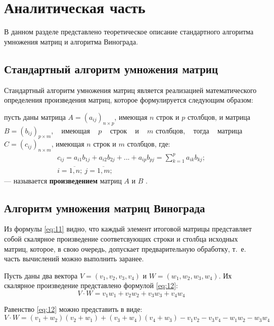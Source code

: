 \chapter{Аналитическая часть}

В данном разделе представлено теоретическое описание стандартного алгоритма
умножения матриц и алгоритма Винограда.

\section{Стандартный алгоритм умножения матриц}

Стандартный алгоритм умножения матриц является реализацией математического
определения произведения матриц, которое формулируется следующим образом:

    пусть даны матрица $A = (a_{ij})_{n \times p}$, имеющая $n$ строк и $p$
столбцов, и матрица ~$B = (b_{ij})_{p \times m}$, ~ имеющая ~ $p$ ~ строк ~ и ~
$m$ столбцов, ~ тогда ~ матрица\\ ${C=(c_{ij})_{n \times m}}$, имеющая $n$
строк и $m$ столбцов, где:
\begin{equation}\label{eq:11}
    \begin{gathered}
        c_{ij}=a_{i1}b_{1j}+a_{i2}b_{2j} +...+a_{ip}b_{pj}=\sum\limits_{k=1}^p
        a_{ik}b_{kj};\\
        i = \overline{1,n};~j = \overline{1,m};
    \end{gathered}
\end{equation}
--- называется \textbf{произведением} матриц $A$ и $B$ \cite{math}.

\section{Алгоритм умножения матриц Винограда}

Из формулы \ref{eq:11} видно, что каждый элемент итоговой матрицы представляет
собой скалярное произведение соответсвующих строки и столбца исходных матриц,
которое, в свою очередь, допускает предварительную обработку, т.~е. часть
вычислений можно выполнить заранее.

Пусть даны два вектора $V=(v_1, v_2, v_3, v_4)$ и
$W=(w_1,w_2,w_3,w_4)$. Их скалярное произведение
представлено формулой \ref{eq:12}:
\begin{equation}\label{eq:12}
    V \cdot W = v_1w_1+v_2w_2+v_3w_3+v_4w_4
\end{equation}

Равенство \ref{eq:12} можно представить в виде:
\begin{equation}\label{eq:13}
    V \cdot W = (v_1+w_2)(v_2+w_1)+(v_3+w_4)(v_4+w_3)-v_1v_2-v_3v_4-w_1w_2-w_3w_4
\end{equation}

